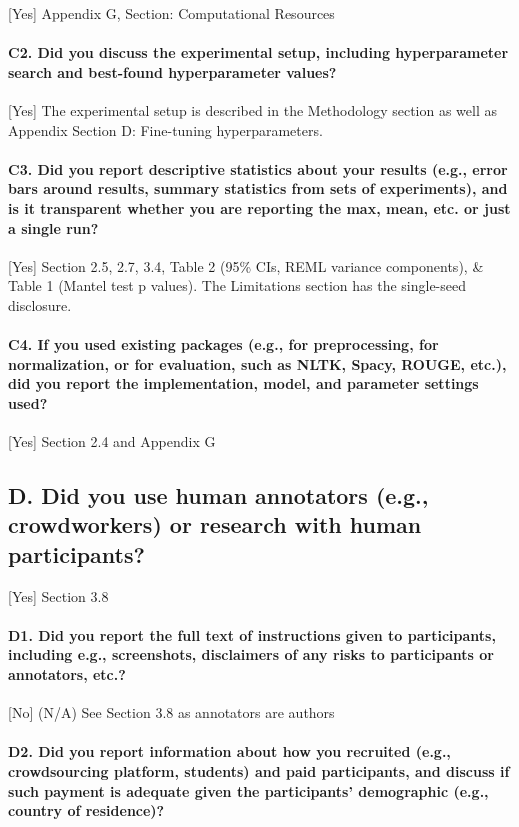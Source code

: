 \documentclass{article}
\begin{document}
[Yes] Appendix G, Section: Computational Resources
\paragraph{C2. Did you discuss the experimental setup, including hyperparameter search and best-found hyperparameter values?}

[Yes] The experimental setup is described in the Methodology section as well as Appendix Section D: Fine-tuning hyperparameters.
\paragraph{C3. Did you report descriptive statistics about your results (e.g., error bars around results, summary statistics from sets of experiments), and is it transparent whether you are reporting the max, mean, etc. or just a single run?}

[Yes] Section 2.5, 2.7, 3.4, Table 2 (95\% CIs, REML variance components), \& Table 1 (Mantel test p values). The Limitations section has the single-seed disclosure.

\paragraph{C4. If you used existing packages (e.g., for preprocessing, for normalization, or for evaluation, such as NLTK, Spacy, ROUGE, etc.), did you report the implementation, model, and parameter settings used?}

[Yes] Section 2.4 and Appendix G
\subsection*{D. Did you use human annotators (e.g., crowdworkers) or research with human participants?}

[Yes] Section 3.8
\paragraph*{D1. Did you report the full text of instructions given to participants, including e.g., screenshots, disclaimers of any risks to participants or annotators, etc.?}

[No] (N/A) See Section 3.8 as annotators are authors
\paragraph{D2. Did you report information about how you recruited (e.g., crowdsourcing platform, students) and paid participants, and discuss if such payment is adequate given the participants’ demographic (e.g., country of residence)?}
\end{document}
